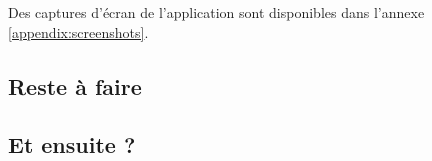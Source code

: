 Des captures d'écran de l'application sont disponibles dans l'annexe \ref{appendix:screenshots}.

\subsection{Reste à faire}


\subsection{Et ensuite ?}
